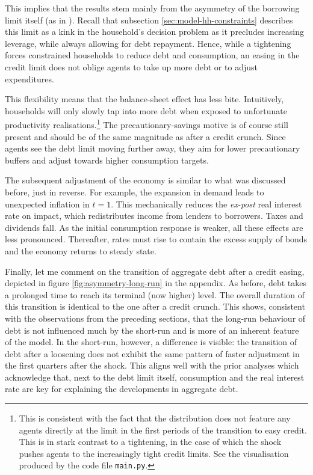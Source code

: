 \documentclass[a4paper,12pt]{article} %
\numberwithin{equation}{section} %
\numberwithin{figure}{section}
\numberwithin{table}{section}
\begin{document}
This implies that the results stem mainly from the asymmetry of the borrowing limit itself (as in \cite{guerrieri2017asym}). Recall that subsection \ref{sec:model-hh-constraints} describes this limit as a kink in the household's decision problem as it precludes increasing leverage, while always allowing for debt repayment. Hence, while a tightening forces constrained households to reduce debt and consumption, an easing in the credit limit does not oblige agents to take up more debt or to adjust expenditures.

This flexibility means that the balance-sheet effect has less bite. Intuitively, households will only slowly tap into more debt when exposed to  unfortunate productivity realisations.\footnote{This is consistent with the fact that the distribution does not feature any agents directly at the limit in the first periods of the transition to easy credit. This is in stark contrast to a tightening, in the case of which the shock pushes agents to the increasingly tight credit limits. See the visualisation produced by the code file \texttt{main.py}.} The precautionary-savings motive is of course still present and should be of the same magnitude as after a credit crunch. Since agents see the debt limit moving further away, they aim for lower precautionary buffers and adjust towards higher consumption targets. 

The subsequent adjustment of the economy is similar to what was discussed before, just in reverse. For example, the expansion in demand leads to unexpected inflation in $t=1$. This mechanically reduces the \textit{ex-post} real interest rate on impact, which redistributes income from lenders to borrowers. Taxes and dividends fall. As the initial consumption response is weaker, all these effects are less pronounced. Thereafter, rates must rise to contain the excess supply of bonds and the economy returns to steady state.

Finally, let me comment on the transition of aggregate debt after a credit easing, depicted in figure \ref{fig:asymmetry-long-run} in the appendix. As before, debt takes a prolonged time to reach its terminal (now higher) level. The overall duration of this transition is identical to the one after a credit crunch. This shows, consistent with the observations from the preceding sections, that the long-run behaviour of debt is not influenced much by the short-run and is more of an inherent feature of the model. In the short-run, however, a difference is visible: the transition of debt after a loosening does not exhibit the same pattern of faster adjustment in the first quarters after the shock. This aligns well with the prior analyses which acknowledge that, next to the debt limit itself, consumption and the real interest rate are key for explaining the developments in aggregate debt.
\end{document}
